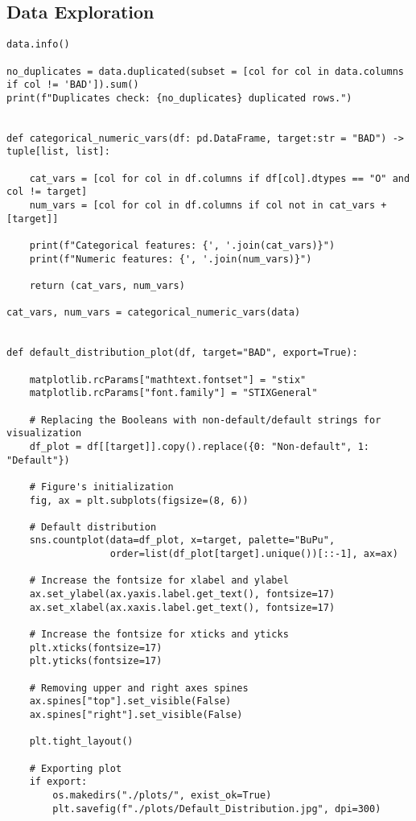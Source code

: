 \subsection{Data Exploration}
\begin{lstlisting}[basicstyle=\footnotesize\ttfamily]
data.info()

no_duplicates = data.duplicated(subset = [col for col in data.columns if col != 'BAD']).sum()
print(f"Duplicates check: {no_duplicates} duplicated rows.")


def categorical_numeric_vars(df: pd.DataFrame, target:str = "BAD") -> tuple[list, list]:
    
    cat_vars = [col for col in df.columns if df[col].dtypes == "O" and col != target]
    num_vars = [col for col in df.columns if col not in cat_vars + [target]]

    print(f"Categorical features: {', '.join(cat_vars)}")
    print(f"Numeric features: {', '.join(num_vars)}")

    return (cat_vars, num_vars)

cat_vars, num_vars = categorical_numeric_vars(data)


def default_distribution_plot(df, target="BAD", export=True):
    
    matplotlib.rcParams["mathtext.fontset"] = "stix"
    matplotlib.rcParams["font.family"] = "STIXGeneral"
    
    # Replacing the Booleans with non-default/default strings for visualization
    df_plot = df[[target]].copy().replace({0: "Non-default", 1: "Default"})

    # Figure's initialization
    fig, ax = plt.subplots(figsize=(8, 6))
    
    # Default distribution
    sns.countplot(data=df_plot, x=target, palette="BuPu",
                  order=list(df_plot[target].unique())[::-1], ax=ax)
    
    # Increase the fontsize for xlabel and ylabel
    ax.set_ylabel(ax.yaxis.label.get_text(), fontsize=17)
    ax.set_xlabel(ax.xaxis.label.get_text(), fontsize=17)

    # Increase the fontsize for xticks and yticks
    plt.xticks(fontsize=17)
    plt.yticks(fontsize=17)

    # Removing upper and right axes spines
    ax.spines["top"].set_visible(False)
    ax.spines["right"].set_visible(False)

    plt.tight_layout()
    
    # Exporting plot
    if export:
        os.makedirs("./plots/", exist_ok=True)
        plt.savefig(f"./plots/Default_Distribution.jpg", dpi=300)


\end{lstlisting}
